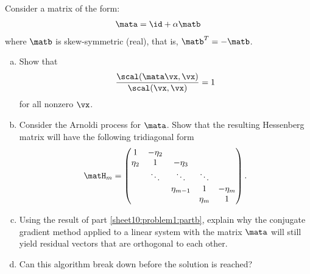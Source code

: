 
\begin{Sheet}
  \label{sheet10}

  \begin{Problem}
    Consider a matrix of the form:
    \begin{gather*}
      \mata = \id + \alpha \matb
    \end{gather*}
    where $\matb$ is skew-symmetric (real), that is,
    $\matb^T = -\matb$.
    \begin{enumerate}[(a)]
    \item Show that
      \begin{gather*}
        \frac{\scal(\mata\vx,\vx)}{\scal(\vx,\vx)} = 1
      \end{gather*}
      for all nonzero $\vx$.
    \item\label{sheet10:problem1:partb} Consider the Arnoldi process
      for $\mata$. Show that the resulting Hessenberg matrix will have
      the following tridiagonal form
      \begin{gather*}
        \matH_m =
        \begin{pmatrix}
          1&-\eta_2&&& \\
          \eta_2&1&-\eta_3&& \\
           &\ddots&\ddots&\ddots& \\
           &&\eta_{m-1}&1&-\eta_m \\
           &&&\eta_m&1
        \end{pmatrix}
        .
      \end{gather*}
    \item Using the result of part \eqref{sheet10:problem1:partb},
      explain why the conjugate gradient method applied to a linear
      system with the matrix $\mata$ will still yield residual vectors
      that are orthogonal to each other.
    \item Can this algorithm break down before the solution is
      reached?
    \end{enumerate}
  \end{Problem}


\end{Sheet}
